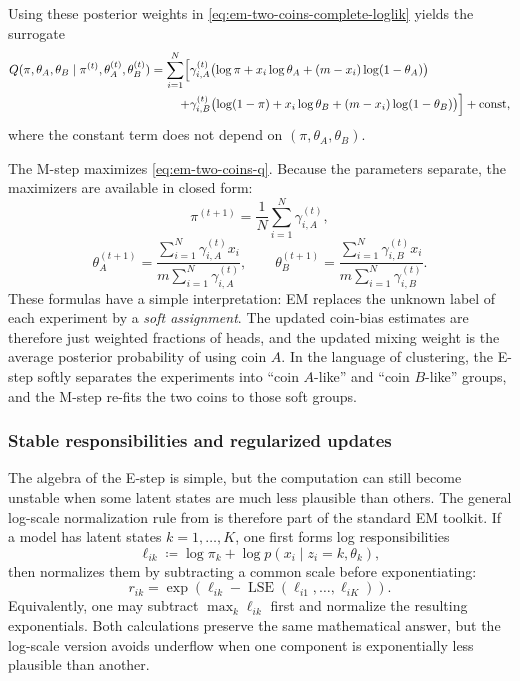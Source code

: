 Using these posterior weights in \eqref{eq:em-two-coins-complete-loglik} yields the surrogate
\begin{align}
  Q(\pi,\theta_A,\theta_B \mid \pi^{(t)},\theta_A^{(t)},\theta_B^{(t)})
  =
  \sum_{i=1}^N
  \Bigl[
    &\gamma_{i,A}^{(t)}\bigl(\log \pi + x_i\log \theta_A + (m-x_i)\log(1-\theta_A)\bigr)
    \nonumber\\
    +
    &\gamma_{i,B}^{(t)}\bigl(\log(1-\pi) + x_i\log \theta_B + (m-x_i)\log(1-\theta_B)\bigr)
  \Bigr]
  + \text{const},
  \label{eq:em-two-coins-q}
\end{align}
where the constant term does not depend on $(\pi,\theta_A,\theta_B)$.

The M-step maximizes \eqref{eq:em-two-coins-q}.
Because the parameters separate, the maximizers are available in closed form:
\begin{equation}
  \pi^{(t+1)} = \frac{1}{N}\sum_{i=1}^N \gamma_{i,A}^{(t)},
  \label{eq:em-two-coins-pi-update}
\end{equation}
\begin{equation}
  \theta_A^{(t+1)}
  =
  \frac{\sum_{i=1}^N \gamma_{i,A}^{(t)} x_i}{m\sum_{i=1}^N \gamma_{i,A}^{(t)}},
  \qquad
  \theta_B^{(t+1)}
  =
  \frac{\sum_{i=1}^N \gamma_{i,B}^{(t)} x_i}{m\sum_{i=1}^N \gamma_{i,B}^{(t)}}.
  \label{eq:em-two-coins-theta-update}
\end{equation}
These formulas have a simple interpretation:
EM replaces the unknown label of each experiment by a \emph{soft assignment}.
The updated coin-bias estimates are therefore just weighted fractions of heads, and the updated mixing weight is the average posterior probability of using coin $A$.
In the language of clustering, the E-step softly separates the experiments into ``coin $A$-like'' and ``coin $B$-like'' groups, and the M-step re-fits the two coins to those soft groups.

\subsubsection{Stable responsibilities and regularized updates}
\label{subsubsec:em-stability}

The algebra of the E-step is simple, but the computation can still become unstable when some latent states are much less plausible than others.
The general log-scale normalization rule from  is therefore part of the standard EM toolkit.
If a model has latent states $k=1,\dots,K$, one first forms log responsibilities
\[
  \ell_{ik}
  \coloneqq
  \log \pi_k + \log p(x_i\mid z_i=k,\theta_k),
\]
then normalizes them by subtracting a common scale before exponentiating:
\[
  r_{ik}
  =
  \exp\!\left(
    \ell_{ik} - \operatorname{LSE}(\ell_{i1},\dots,\ell_{iK})
  \right).
\]
Equivalently, one may subtract $\max_k \ell_{ik}$ first and normalize the resulting exponentials.
Both calculations preserve the same mathematical answer, but the log-scale version avoids underflow when one component is exponentially less plausible than another.

